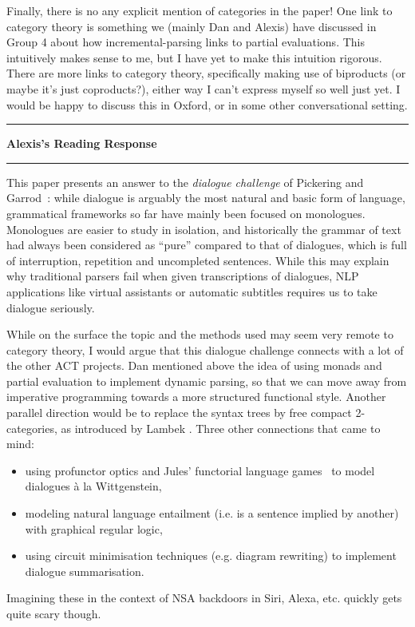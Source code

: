 \documentclass{amsart}
\newcommand{\iam}[1]{
  \vspace{0.25em}
  \hrule
  \vspace{0.25em}
  \textbf{{#1}'s Reading Response}
  \vspace{0.25em}
  \hrule
  \vspace{1em}
}
\begin{document}
Finally, there is no any explicit mention of categories in the paper! One link to category theory is something we (mainly Dan and Alexis) have discussed in Group 4 about how incremental-parsing links to partial evaluations. This intuitively makes sense to me, but I have yet to make this intuition rigorous. There are more links to category theory, specifically making use of biproducts (or maybe it’s just coproducts?), either way I can’t express myself so well just yet. I would be happy to discuss this in Oxford, or in some other conversational setting.

\iam{Alexis}
This paper presents an answer to the \emph{dialogue challenge} of Pickering and Garrod~\cite{PickeringGarrod04}: while dialogue is arguably the most natural and basic form of language, grammatical frameworks so far have mainly been focused on monologues.
Monologues are easier to study in isolation, and historically the grammar of text had always been considered as ``pure'' compared to that of dialogues, which is full of interruption, repetition and uncompleted sentences.
While this may explain why traditional parsers fail when given transcriptions of dialogues, NLP applications like virtual assistants or automatic subtitles requires us to take dialogue seriously.

While on the surface the topic and the methods used may seem very remote to category theory, I would argue that this dialogue challenge connects with a lot of the other ACT projects.
Dan mentioned above the idea of using monads and partial evaluation to implement dynamic parsing, so that we can move away from imperative programming towards a more structured functional style.
Another parallel direction would be to replace the syntax trees by free compact 2-categories, as introduced by Lambek \cite{LambekPreller07}.
Three other connections that came to mind:
\begin{itemize}
  \item using profunctor optics and Jules' functorial language games~\cite{HedgesLewis18} to model dialogues à la Wittgenstein,
  \item modeling natural language entailment (i.e. is a sentence implied by another) with graphical regular logic,
  \item using circuit minimisation techniques (e.g. diagram rewriting) to implement dialogue summarisation.
\end{itemize}
Imagining these in the context of NSA backdoors in Siri, Alexa, etc. quickly gets quite scary though.
\end{document}
